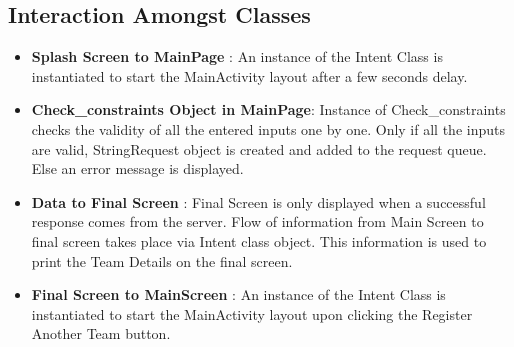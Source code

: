 \documentclass{article}
\begin{document}
\subsection{Interaction Amongst Classes}

\begin{itemize}
\item \textbf{Splash Screen to MainPage} : An instance of the Intent Class is instantiated to start the MainActivity layout after a few seconds delay.
\item \textbf{Check\_constraints Object in MainPage}: Instance of Check\_constraints checks the validity of all the entered inputs one by one. Only if all the inputs are valid, StringRequest object is created and added to the request queue. Else an error message is displayed.
\item\textbf{Data to Final Screen} : Final Screen is only displayed when a successful response comes from the server. Flow of information from Main Screen to final screen takes place via Intent class object. This information is used to print the Team Details on the final screen.
\item\textbf{Final Screen to MainScreen} : An instance of the Intent Class is instantiated to start the MainActivity layout upon clicking the Register Another Team button.
\end{itemize}



\end{document}

